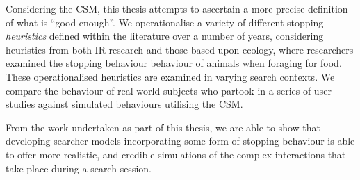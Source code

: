 \begin{preamble}
Considering the CSM, this thesis attempts to ascertain a more precise definition of what is ``good enough''. We operationalise a variety of different stopping \emph{heuristics} defined within the literature over a number of years, considering heuristics from both IR research and those based upon ecology, where researchers examined the stopping behaviour behaviour of animals when foraging for food. These operationalised heuristics are examined in varying search contexts. We compare the behaviour of real-world subjects who partook in a series of user studies against simulated behaviours utilising the CSM.

From the work undertaken as part of this thesis, we are able to show that developing searcher models incorporating some form of stopping behaviour is able to offer more realistic, and credible simulations of the complex interactions that take place during a search session. 


\end{preamble}
